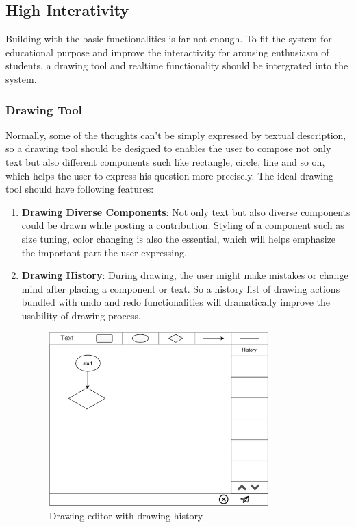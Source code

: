 \begin{enumerate}
\end{enumerate}


\subsection{High Interativity}
Building with the basic functionalities is far not enough. To fit the system for educational purpose and improve the interactivity for arousing enthusiasm of students, a drawing tool and realtime functionality should be intergrated into the system.

\subsubsection{Drawing Tool}
Normally, some of the thoughts can't be simply expressed by textual description, so a drawing tool should be designed to enables the user to compose not only text but also different components such like rectangle, circle, line and so on, which helps the user to express his question more precisely.
The ideal drawing tool should have following features:

\begin{enumerate}
\item
\textbf{Drawing Diverse Components}: Not only text but also diverse components could be drawn while posting a contribution. Styling of a component such as size tuning, color changing is also the essential, which will helps emphasize the important part the user expressing.

\item
\textbf{Drawing History}: During drawing, the user might make mistakes or change mind after placing a component or text. So a history list of drawing actions bundled with undo and redo functionalities will dramatically improve the usability of drawing process.

\begin{figure}[!htbp]
  \centering
    \includegraphics[width=0.8\textwidth]{Figures/mockup/editor.pdf}
  \caption{Drawing editor with drawing history}
\end{figure}


\end{enumerate}


